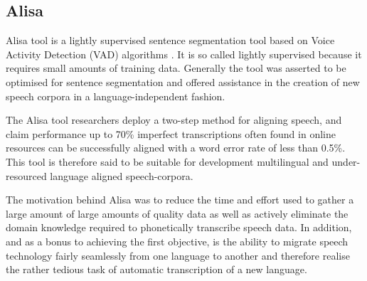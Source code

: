 \subsection{Alisa}\label{c3sec_alisa}
Alisa tool is a lightly supervised sentence segmentation tool based on Voice Activity Detection (VAD) algorithms \citep{stan2016alisa}.  It is so called lightly supervised because it requires small amounts of training data.  Generally the tool was asserted to be optimised for sentence segmentation and offered assistance in the creation of new speech corpora in a language-independent fashion. 

The Alisa tool researchers deploy a two-step method for aligning speech, and claim performance up to 70\% imperfect transcriptions often found in online resources can be successfully aligned with a word error rate of less than 0.5\%.  This tool is therefore said to be suitable for development multilingual and under-resourced language aligned speech-corpora.

The motivation behind Alisa was to reduce the time and effort used to gather a large amount of large amounts of quality data as well as actively eliminate the domain knowledge required to phonetically transcribe speech data.  In addition, and as a bonus to achieving the first objective, is the ability to migrate speech technology fairly seamlessly from one language to another and therefore realise the rather tedious task of automatic transcription of a new language.


